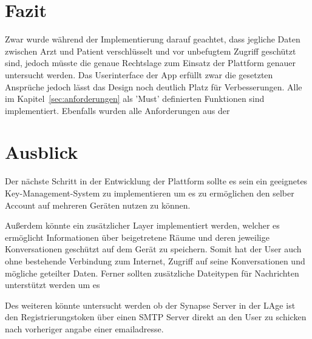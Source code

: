     \chapter{Fazit}\label{ch:fazit}
    Zwar wurde während der Implementierung darauf geachtet, dass jegliche Daten zwischen Arzt und Patient verschlüsselt und vor unbefugtem Zugriff geschützt sind, jedoch müsste die genaue Rechtslage zum Einsatz der Plattform genauer untersucht werden.
    Das Userinterface der App erfüllt zwar die gesetzten Ansprüche jedoch lässt das Design noch deutlich Platz für Verbesserungen.
    Alle im Kapitel~\ref{sec:anforderungen} als 'Must' definierten Funktionen sind implementiert.
    Ebenfalls wurden alle Anforderungen aus der

    \chapter{Ausblick}\label{ch:ausblick}
    Der nächste Schritt in der Entwicklung der Plattform sollte es sein ein geeignetes Key-Management-System zu implementieren um es zu ermöglichen den selber Account auf mehreren Geräten nutzen zu können.

    Außerdem könnte ein zusätzlicher Layer implementiert werden, welcher es ermöglicht Informationen über beigetretene Räume und deren jeweilige Konversationen geschützt auf dem Gerät zu speichern.
    Somit hat der User auch ohne bestehende Verbindung zum Internet, Zugriff auf seine Konversationen und mögliche geteilter Daten.
    Ferner sollten zusätzliche Dateitypen für Nachrichten unterstützt werden um es

    Des weiteren könnte untersucht werden ob der Synapse Server in der LAge ist den Registrierungstoken über einen SMTP Server direkt an den User zu schicken nach vorheriger angabe einer emailadresse.

%

%

    \backmatter
    \listoffigures

    
    

    \appendix

